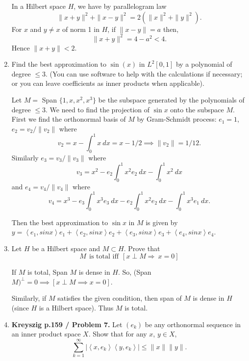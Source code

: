 \documentclass[12pt]{article}
\newcommand{\inn}[2]{\left\langle #1, #2 \right\rangle}
\begin{document}
\begin{enumerate}
\begin{mybox}
    In a Hilbert space $H$, we have by parallelogram
    law
    $$\|x+y\|^2+\|x-y\|^2=2(\|x\|^2+\|y\|^2).$$
    For $x$ and $y\neq x$ of norm 1 in $H$, if $\|x-y\|
    =a$ then,
    $$\|x+y\|^2=4-a^2<4.$$
    Hence $\|x+y\|<2$.
\end{mybox}
 
\item Find the best approximation to $\sin(x)$ in
$L^2[0,1]$ by a polynomial of degree $\leq 3$. 
(You can use software to help with the calculations
if necessary; or you can leave coefficients as inner
products when applicable).  
\begin{mybox}

    Let $M=$ Span $\{1, x, x^2, x^3\}$ be the subspace
    generated by the polynomials of degree $\leq 3$. We
    need to find the projection of $\sin x$ onto the
    subspace $M$. First we find the orthonormal basis of
    $M$ by Gram-Schmidt process:
    $e_1=1$, $e_2=v_2/\|v_2\|$ where
    $$v_2 = x-\int_0^1{x\ dx}=x-1/2 \implies \|v_2\|=1/12.$$
    Similarly $e_3=v_3/\|v_3\|$ where
    $$v_3=x^2-e_2\int_0^1{x^2e_2\ dx}-
    \int_0^1{x^2\ dx}$$ and $e_4=v_4/\|v_4\|$ where
    $$v_4=x^3-e_3\int_0^1{x^3e_3\ dx}
    - e_2\int_0^1{x^2e_2\ dx}-
    \int_0^1{x^3e_1\ dx}.$$

    Then the best approximation to $\sin x$ in $M$ is
    given by $y=\inn{e_1}{sin x}e_1+\inn{e_2}{sin x}e_2
    +\inn{e_3}{sin x}e_3+\inn{e_4}{sin x}e_4$.
\end{mybox}
 
\item Let $H$ be a Hilbert space and  $M \subset H$.
Prove that
$$M \ \ \text{is total iff} \ \ [x \perp M \Rightarrow
\ x = 0] $$
\begin{mybox}

    If $M$ is total, Span $M$ is dense in $H$. So,
    (Span $M)^\perp=0\implies [x\perp M\implies x=0]$.

    \vspace*{3mm}
    Similarly, if $M$ satisfies the given condition, then
    span of $M$ is dense in $H$ (since $H$ is a Hilbert
    space). Thus $M$ is total.
\end{mybox}
 
\item \textbf{Kreyszig p.159 / Problem 7.}
Let $(e_k)$ be any orthonormal sequence in an inner product
space $X$. Show that for any $x$, $y\in X$,
$$\sum_{k=1}^\infty{|\inn{x}{e_k}\inn{y}{e_k}|}
\leq \|x\|\|y\|.$$ 
\begin{mybox}


\end{mybox}
\end{enumerate}
\end{document}
